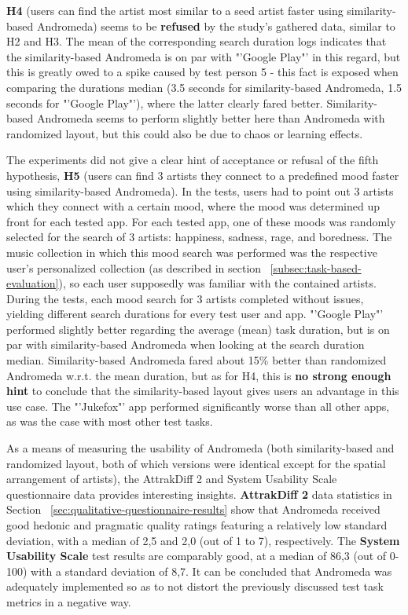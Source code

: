 \textbf{H4} (users can find the artist most similar to a seed artist faster using  similarity-based Andromeda) seems to be \textbf{refused} by the study's gathered data, similar to H2 and H3. The mean of the corresponding search duration logs indicates that the similarity-based Andromeda is on par with "'Google Play"' in this regard, but this is greatly owed to a spike caused by test person 5 - this fact is exposed when comparing the durations median (3.5 seconds for similarity-based Andromeda, 1.5 seconds for "'Google Play"'), where the latter clearly fared better. Similarity-based Andromeda seems to perform slightly better here than Andromeda with randomized layout, but this could also be due to chaos or learning effects.

The experiments did not give a clear hint of acceptance or refusal of the fifth hypothesis, \textbf{H5} (users can find 3 artists they connect to a predefined mood faster using similarity-based Andromeda). In the tests, users had to point out 3 artists which they connect with a certain mood, where the mood was determined up front for each tested app. For each tested app, one of these moods was randomly selected for the search of 3 artists: happiness, sadness, rage, and boredness. The music collection in which this mood search was performed was the respective user's personalized collection (as described in section ~\ref{subsec:task-based-evaluation}), so each user supposedly was familiar with the contained artists. During the tests, each mood search for 3 artists completed without issues, yielding different search durations for every test user and app. "'Google Play"' performed slightly better regarding the average (mean) task duration, but is on par with similarity-based Andromeda when looking at the search duration median. Similarity-based Andromeda fared about 15\% better than randomized Andromeda w.r.t. the mean duration, but as for H4, this is \textbf{no strong enough hint} to conclude that the similarity-based layout gives users an advantage in this use case. The "'Jukefox"' app performed significantly worse than all other apps, as was the case with most other test tasks.

As a means of measuring the usability of Andromeda (both similarity-based and randomized layout, both of which versions were identical except for the spatial arrangement of artists), the AttrakDiff 2 and System Usability Scale questionnaire data provides interesting insights. \textbf{AttrakDiff 2} data statistics in Section ~\ref{sec:qualitative-questionnaire-results} show that Andromeda received good hedonic and pragmatic quality ratings featuring a relatively low standard deviation, with a median of 2,5 and 2,0 (out of 1 to 7), respectively. The \textbf{System Usability Scale} test results are comparably good, at a median of 86,3 (out of 0-100) with a standard deviation of 8,7. It can be concluded that Andromeda was adequately implemented so as to not distort the previously discussed test task metrics in a negative way.

